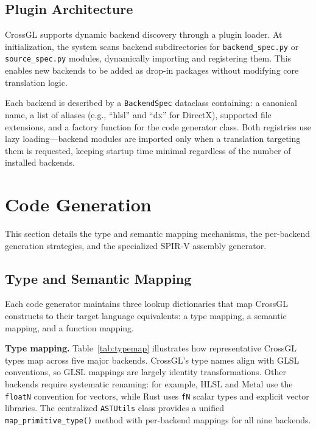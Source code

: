 \documentclass{svproc}
\begin{document}
\subsection{Plugin Architecture}

CrossGL supports dynamic backend discovery through a plugin loader. At initialization, the system scans backend subdirectories for \texttt{backend\_spec.py} or \texttt{source\_spec.py} modules, dynamically importing and registering them. This enables new backends to be added as drop-in packages without modifying core translation logic.

Each backend is described by a \texttt{BackendSpec} dataclass containing: a canonical name, a list of aliases (e.g., ``hlsl'' and ``dx'' for DirectX), supported file extensions, and a factory function for the code generator class. Both registries use lazy loading---backend modules are imported only when a translation targeting them is requested, keeping startup time minimal regardless of the number of installed backends.

\section{Code Generation}

This section details the type and semantic mapping mechanisms, the per-backend generation strategies, and the specialized SPIR-V assembly generator.

\subsection{Type and Semantic Mapping}

Each code generator maintains three lookup dictionaries that map CrossGL constructs to their target language equivalents: a type mapping, a semantic mapping, and a function mapping.

\textbf{Type mapping.} Table~\ref{tab:typemap} illustrates how representative CrossGL types map across five major backends. CrossGL's type names align with GLSL conventions, so GLSL mappings are largely identity transformations. Other backends require systematic renaming: for example, HLSL and Metal use the \texttt{floatN} convention for vectors, while Rust uses \texttt{fN} scalar types and explicit vector libraries. The centralized \texttt{ASTUtils} class provides a unified \texttt{map\_primitive\_type()} method with per-backend mappings for all nine backends.
\end{document}
